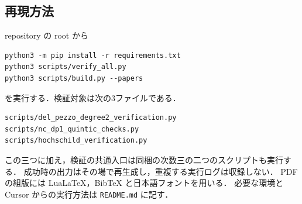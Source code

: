 \Needspace{75mm}
\subsection{再現方法}

repository の root から
\begin{verbatim}
python3 -m pip install -r requirements.txt
python3 scripts/verify_all.py
python3 scripts/build.py --papers
\end{verbatim}
を実行する．検証対象は次の3ファイルである．
\begin{verbatim}
scripts/del_pezzo_degree2_verification.py
scripts/nc_dp1_quintic_checks.py
scripts/hochschild_verification.py
\end{verbatim}
この三つに加え，検証の共通入口は同梱の次数三の二つのスクリプトも実行する．
成功時の出力はその場で再生成し，重複する実行ログは収録しない．
PDF の組版には LuaLaTeX，BibTeX と日本語フォントを用いる．
必要な環境と Cursor からの実行方法は \texttt{README.md} に記す．

